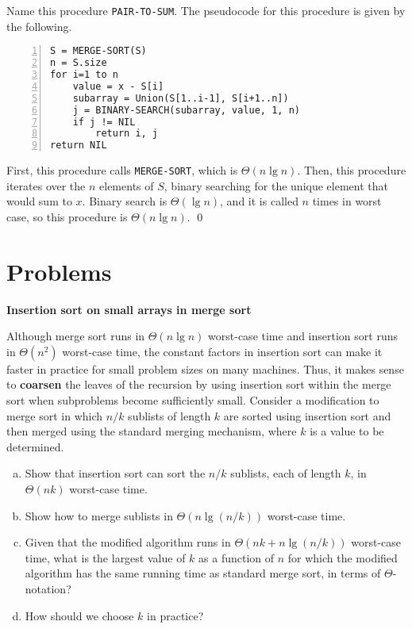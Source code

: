 \sol Name this procedure \verb|PAIR-TO-SUM|. The pseudocode for this procedure is given by the following.
\begin{Verbatim}[frame=single,numbers=left,samepage=true,label={PAIR-TO-SUM(S, x)}]
S = MERGE-SORT(S)
n = S.size
for i=1 to n
    value = x - S[i]
    subarray = Union(S[1..i-1], S[i+1..n])
    j = BINARY-SEARCH(subarray, value, 1, n)
    if j != NIL
        return i, j
return NIL
\end{Verbatim}
First, this procedure calls \verb|MERGE-SORT|, which is $\Theta(n \lg n)$. Then, this procedure iterates over the $n$ elements of $S$, binary searching for the unique element that would sum to $x$. Binary search is $\Theta(\lg n)$, and it is called $n$ times in worst case, so this procedure is $\Theta(n \lg n)$.
\qed

\section{Problems}

 \textbf{Insertion sort on small arrays in merge sort}

Although merge sort runs in $\Theta(n \lg n)$ worst-case time and insertion sort runs in $\Theta(n^2)$ worst-case time, the constant factors in insertion sort can make it faster in practice for small problem sizes on many machines. Thus, it makes sense to \textbf{coarsen} the leaves of the recursion by using insertion sort within the merge sort when subproblems become sufficiently small. Consider a modification to merge sort in which $n/k$ sublists of length $k$ are sorted using insertion sort and then merged using the standard merging mechanism, where $k$ is a value to be determined.

\begin{enumerate}[(a)]
    \item Show that insertion sort can sort the $n/k$ sublists, each of length $k$, in $\Theta(nk)$ worst-case time.
    \item Show how to merge sublists in $\Theta(n \lg(n/k))$ worst-case time.
    \item Given that the modified algorithm runs in $\Theta(nk + n\lg(n/k))$ worst-case time, what is the largest value of $k$ as a function of $n$ for which the modified algorithm has the same running time as standard merge sort, in terms of $\Theta$-notation?
    \item How should we choose $k$ in practice?
\end{enumerate}

